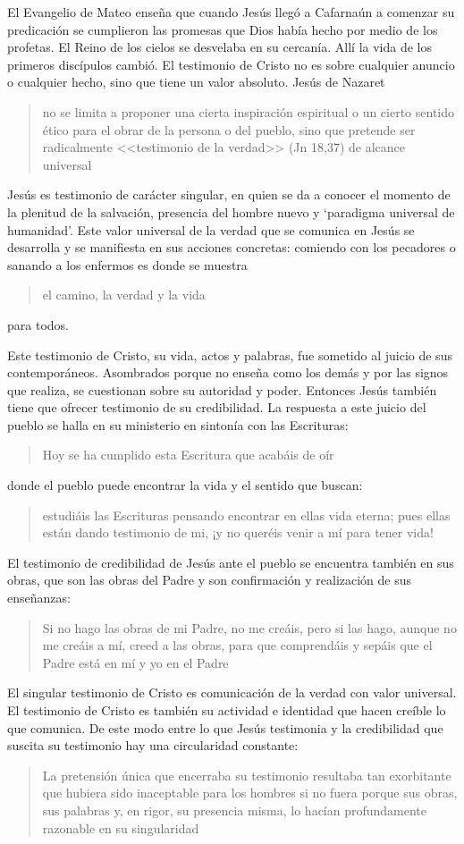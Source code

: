 El Evangelio de Mateo enseña que cuando Jesús llegó a Cafarnaún a comenzar su predicación se cumplieron las promesas que Dios había hecho por medio de los profetas. El Reino de los cielos se desvelaba en su cercanía. Allí la vida de los primeros discípulos cambió. El testimonio de Cristo no es sobre cualquier anuncio o cualquier hecho, sino que tiene un valor absoluto. Jesús de Nazaret \blockquote[{\cite[126]{prades2015testimonio}}]{no se limita a proponer una cierta inspiración espiritual o un cierto sentido ético para el obrar de la persona o del pueblo, sino que pretende ser radicalmente <<testimonio de la verdad>> (Jn 18,37) de alcance universal}.

Jesús es testimonio de carácter singular, en quien se da a conocer el momento de la plenitud de la salvación, presencia del hombre nuevo y `paradigma universal de humanidad'\autocite[Cf.~][279; 290--291]{ninot2009tf}. Este valor universal de la verdad que se comunica en Jesús se desarrolla y se manifiesta en sus acciones concretas: comiendo con los pecadores o sanando a los enfermos es donde se muestra \blockquote[][\,(Cf.~Jn 14,6)]{el camino, la verdad y la vida} para todos.

Este testimonio de Cristo, su vida, actos y palabras, fue sometido al juicio de sus contemporáneos. Asombrados porque no enseña como los demás y por las signos que realiza, se cuestionan sobre su autoridad y poder. Entonces Jesús también tiene que ofrecer testimonio de su credibilidad. La respuesta a este juicio del pueblo se halla en su ministerio en sintonía con las Escrituras: \blockquote[][\,(Lc 4,21)]{Hoy se ha cumplido esta Escritura que acabáis de oír}; donde el pueblo puede encontrar la vida y el sentido que buscan: \blockquote[][\,(Jn 5,39-40)]{estudiáis las Escrituras pensando encontrar en ellas vida eterna; pues ellas están dando testimonio de mi, ¡y no queréis venir a mí para tener vida!}. El testimonio de credibilidad de Jesús ante el pueblo se encuentra también en sus obras, que son las obras del Padre y son confirmación y realización de sus enseñanzas: \blockquote[][\,(Jn 10,38)]{Si no hago las obras de mi Padre, no me creáis, pero si las hago, aunque no me creáis a mí, creed a las obras, para que comprendáis y sepáis que el Padre está en mí y yo en el Padre}.

El singular testimonio de Cristo es comunicación de la verdad con valor universal. El testimonio de Cristo es también su actividad e identidad que hacen creíble lo que comunica. De este modo entre lo que Jesús testimonia y la credibilidad que suscita su testimonio hay una circularidad constante: \blockquote[{\cite[124]{prades2015testimonio}}]{La pretensión única que encerraba su testimonio resultaba tan exorbitante que hubiera sido inaceptable para los hombres si no fuera porque sus obras, sus palabras y, en rigor, su presencia misma, lo hacían profundamente razonable en su singularidad}.

